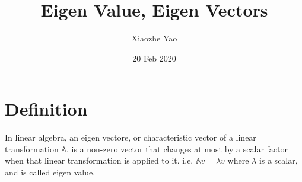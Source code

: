 \documentclass{article}
\title{Eigen Value, Eigen Vectors}
\author{Xiaozhe Yao}
\date{20 Feb 2020}
\begin{document}
\maketitle
\section{Definition}
In linear algebra, an eigen vectore, or characteristic vector of a linear transformation $\mathbb{A}$, is a non-zero vector that changes at most by a scalar factor when that linear transformation is applied to it. i.e. $\mathbb{A}v=\lambda v$ where $\lambda$ is a scalar, and is called eigen value.
\end{document}
